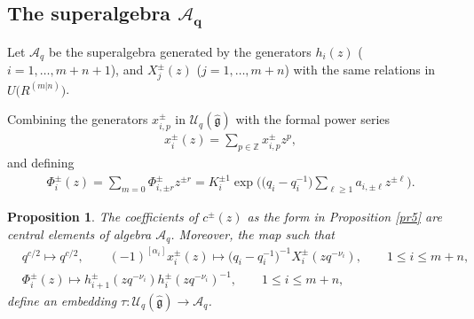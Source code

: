 \documentclass[pdftex]{sigma}
\numberwithin{equation}{section}
\newtheorem{Proposition}[Theorem]{Proposition}
 { \theoremstyle{definition}
\newtheorem{Definition}[Theorem]{Definition}
\newtheorem{Note}[Theorem]{Note}
\newtheorem{Example}[Theorem]{Example}
\newtheorem{Remark}[Theorem]{Remark} }
\begin{document}
\subsection[The superalgebra A\_q]{The superalgebra $\boldsymbol{\mathcal{A}_q}$}


\begin{Definition}
Let $\mathcal{A}_q$ be the superalgebra generated by the generators $h_i(z)$ ($i=1,\dots,\allowbreak m+n+1$), and $X_j^{\pm}(z)$ ($j=1,\dots,m+n$) with the same relations in $U\bigl(R^{(m|n)}\bigr) $.
\end{Definition}

Combining the generators $x_{i,p}^{\pm}$ in $\mathcal{U}_q(\mathfrak{\hat{g}})$ with the formal power series
\begin{gather*}
 x_i^{\pm}(z)=\sum_{p\in\mathbb{Z}}x_{i,p}^{\pm}z^{p},
\end{gather*}
and defining
\begin{gather}\label{homo2}
	\Phi^{\pm}_i(z)=\sum\limits_{m=0}\Phi_{i,\pm r}^{\pm}z^{\pm r}=K_i^{\pm 1} \exp\biggl(\bigl(q_i-q_i^{-1}\bigr)\sum\limits_{\ell\geq 1}a_{i,\pm \ell}z^{\pm \ell}\biggr).
\end{gather}




\begin{Proposition}\label{Apr0} The coefficients of
 $c^{\pm}(z)$ as the form in Proposition {\rm\ref{pr5}} are central elements of algebra $\mathcal{A}_q$. Moreover,
 the map such that
\begin{align*}
 &q^{c/2}\mapsto q^{c/2},\qquad
 (-1)^{[\alpha_i]} x_i^{\pm}(z)\mapsto\bigl(q_i-q_i^{-1}\bigr)^{-1}X_i^{\pm}(zq^{-\nu_i}),\qquad 1\leq i\leq m+n,\\
 &\Phi^{\pm}_{i}(z)\mapsto h_{i+1}^{\pm}(zq^{-\nu_i})h_{i}^{\pm}(zq^{-\nu_i})^{-1},\qquad 1\leq i\leq m+n,
\end{align*}
define an embedding $\tau\colon \mathcal{U}_q(\mathfrak{\hat{g}})\rightarrow\mathcal{A}_q$.
\end{Proposition}
\end{document}
